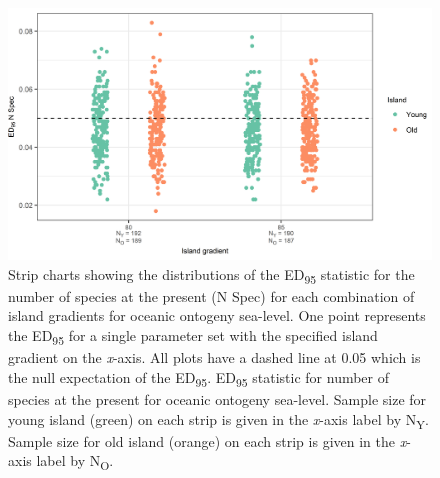 \begin{figure}
    \centering
    \includegraphics{oceanic_gradient_ontogeny_sea_level_num_spec.png}
    \caption{Strip charts showing the distributions of the ED\textsubscript{95} statistic for the number of species at the present (N Spec) for each combination of island gradients for oceanic ontogeny sea-level. One point represents the ED\textsubscript{95} for a single parameter set with the specified island gradient on the \textit{x}-axis. All plots have a dashed line at 0.05 which is the null expectation of the ED\textsubscript{95}. ED\textsubscript{95} statistic for number of species at the present for oceanic ontogeny sea-level. Sample size for young island (green) on each strip is given in the \textit{x}-axis label by N\textsubscript{Y}. Sample size for old island (orange) on each strip is given in the \textit{x}-axis label by N\textsubscript{O}.}
    \label{fig:oceanic_gradient_ontogeny_sea_level_num_spec}
\end{figure}

